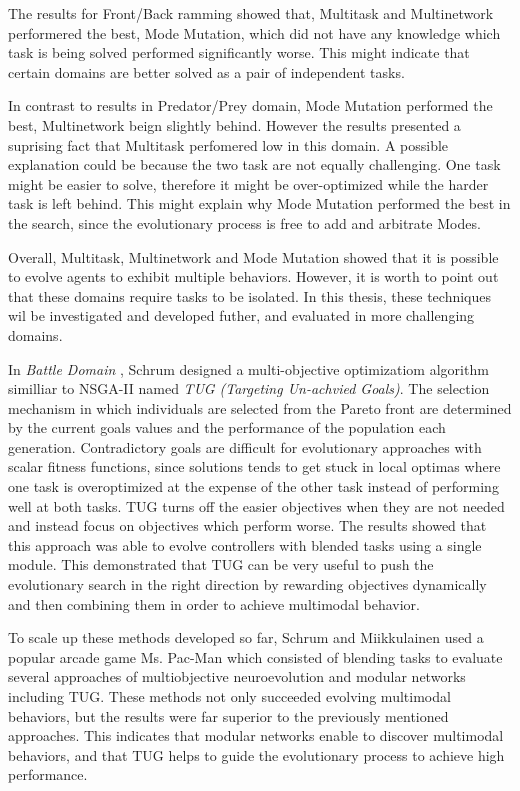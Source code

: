 \documentclass[format=acmsmall, review=false, screen=true]{acmart}
\begin{document}
The results for Front/Back ramming showed that, Multitask and Multinetwork performered the best, Mode Mutation, which did not have any knowledge which task is being solved performed significantly worse. This might indicate that certain domains are better solved as a pair of independent tasks.

In contrast to results in Predator/Prey domain, Mode Mutation performed the best, Multinetwork beign slightly behind. However the results presented a suprising fact that Multitask perfomered low in this domain. A possible explanation could be because the two task are not equally challenging. One task might be easier to solve, therefore it might be over-optimized while the harder task is left behind. This might explain why Mode Mutation performed the best in the search, since the evolutionary process is free to add and arbitrate Modes.

Overall, Multitask, Multinetwork and Mode Mutation showed that it is possible to evolve agents to exhibit multiple behaviors. However, it is worth to point out that these domains require tasks to be isolated. In this thesis, these techniques wil be investigated and developed futher, and evaluated in more challenging domains.

In \emph{Battle Domain} \cite{schrum2010evolving}, Schrum designed a multi-objective optimizatiom algorithm similliar to NSGA-II named \emph{TUG (Targeting Un-achvied Goals)}. The selection mechanism in which individuals are selected from the Pareto front are determined by the current goals values and the performance of the population each generation. Contradictory goals are difficult for evolutionary approaches with scalar fitness functions, since solutions tends to get stuck in local optimas where one task is overoptimized at the expense of the other task instead of performing well at both tasks. TUG turns off the easier objectives when they are not needed and instead focus on objectives which perform worse. The results showed that this approach was able to evolve controllers with blended tasks using a single module. This demonstrated that TUG can be very useful to push the evolutionary search in the right direction by rewarding objectives dynamically and then combining them in order to achieve multimodal behavior.

To scale up these methods developed so far, Schrum and Miikkulainen \cite{schrummiikk2014evolving} used a popular arcade game Ms. Pac-Man which consisted of blending tasks to evaluate several approaches of multiobjective neuroevolution and modular networks including TUG. These methods not only succeeded evolving multimodal behaviors, but the results were far superior to the previously mentioned approaches. This indicates that modular networks enable to discover multimodal behaviors, and that TUG helps to guide the evolutionary process to achieve high performance.
\end{document}
